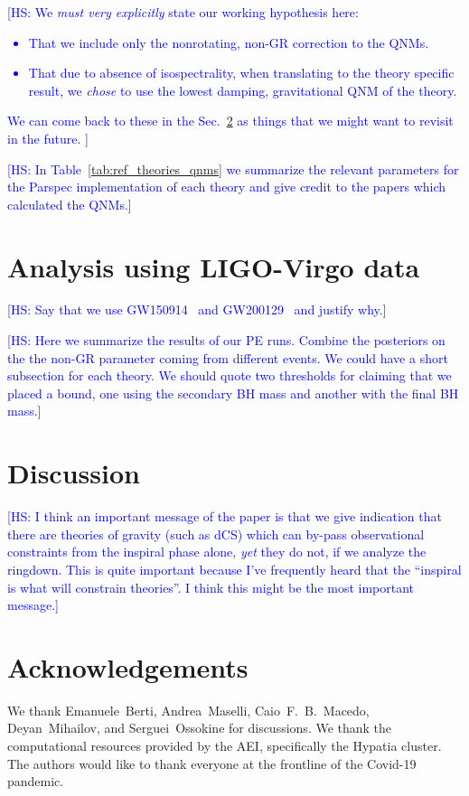 \documentclass[twocolumn,prd,aps,superscriptaddress,preprintnumbers,tightenlines,showpacs,nofootinbib,eqsecnum,amsfonts,amsmath,longbibliography]{revtex4-2}
\newcommand{\hs}[1]{{\textcolor{blue}{{[HS: #1]}} }}
\begin{document}
\hs{We {\it must very explicitly} state our working hypothesis here:
%
\begin{itemize}
    \item That we include only the nonrotating, non-GR correction to the QNMs.
    \item That due to absence of isospectrality, when translating to the theory specific result,
    we {\it chose} to use the lowest damping, gravitational QNM of the theory.
\end{itemize}
%
We can come back to these in the Sec.~\ref{sec:discussion} as things that we
might want to revisit in the future.
}

\hs{In Table~\ref{tab:ref_theories_qnms} we summarize the relevant parameters for
the {\sc Parspec} implementation of each theory and give credit to the papers
which calculated the QNMs.}

\section{Analysis using LIGO-Virgo data}
\label{sec:results}

\hs{Say that we use GW150914~\cite{LIGOScientific:2016aoc} and GW200129~\cite{LIGOScientific:2021djp} and justify why.}

\hs{Here we summarize the results of our PE runs. Combine the posteriors on the
the non-GR parameter coming from different events. We could have a short
subsection for each theory. We should quote two thresholds for claiming
that we placed a bound, one using the secondary BH mass and another with
the final BH mass.}

\section{Discussion}
\label{sec:discussion}

\hs{I think an important message of the paper is that we give indication that
there are theories of gravity (such as dCS) which can by-pass observational
constraints from the inspiral phase alone, {\it yet} they do not, if we
analyze the ringdown. This is quite important because I've frequently heard
that the ``inspiral is what will constrain theories''. I think this might be
the most important message.}

\section*{Acknowledgements}
\label{sec:acknowledgements}
%
We thank Emanuele~Berti, Andrea~Maselli, Caio~F.~B.~Macedo, Deyan~Mihailov, and
Serguei~Ossokine for discussions.
%
We thank the computational resources provided by the AEI, specifically the
{\sc Hypatia} cluster.
%
The authors would like to thank everyone at the frontline of the Covid-19
pandemic.

% 

\end{document}
